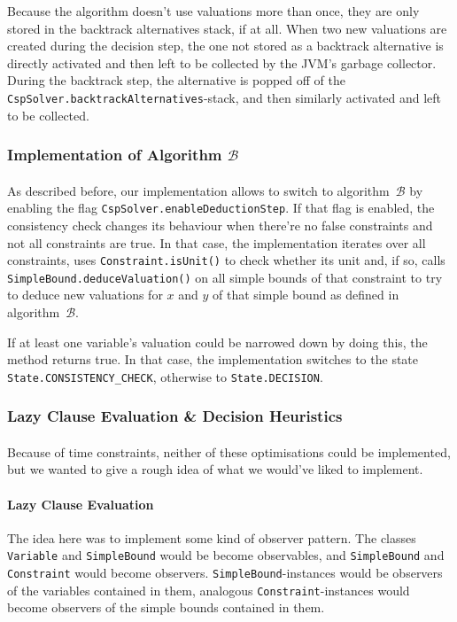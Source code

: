 Because the algorithm doesn't use valuations more than once, they are only stored in the backtrack alternatives stack, if at all.
When two new valuations are created during the decision step, the one not stored as a backtrack alternative is directly activated and then left to be collected by the JVM's garbage collector.
During the backtrack step, the alternative is popped off of the \texttt{CspSolver.backtrackAlternatives}-stack, and then similarly activated and left to be collected.


\subsubsection{Implementation of Algorithm $\mathcal{B}$}

\paragraph{}
As described before, our implementation allows to switch to algorithm~$\mathcal{B}$ by enabling the flag \texttt{CspSolver.enableDeductionStep}.
If that flag is enabled, the consistency check changes its behaviour when there're no false constraints and not all constraints are true.
In that case, the implementation iterates over all constraints, uses \texttt{Constraint.isUnit()} to check whether its unit and, if so, calls \texttt{SimpleBound.deduceValuation()} on all simple bounds of that constraint to try to deduce new valuations for $x$ and $y$ of that simple bound as defined in algorithm~$\mathcal{B}$.

If at least one variable's valuation could be narrowed down by doing this, the method returns true.
In that case, the implementation switches to the state \texttt{State.CONSISTENCY\_CHECK}, otherwise to \texttt{State.DECISION}.


\subsubsection{Lazy Clause Evaluation \& Decision Heuristics}

\paragraph{}
Because of time constraints, neither of these optimisations could be implemented, but we wanted to give a rough idea of what we would've liked to implement.

\paragraph{Lazy Clause Evaluation}
The idea here was to implement some kind of observer pattern.
The classes \texttt{Variable} and \texttt{SimpleBound} would be become observables, and \texttt{SimpleBound} and \texttt{Constraint} would become observers.
\texttt{SimpleBound}-instances would be observers of the variables contained in them, analogous \texttt{Constraint}-instances would become observers of the simple bounds contained in them.


